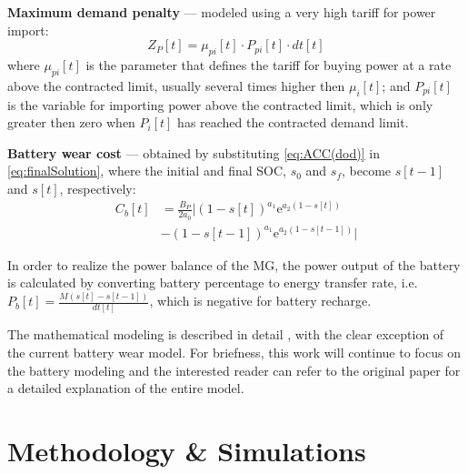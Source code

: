 \documentclass{ieeeaccess}
\begin{document}
    \textbf{Maximum demand penalty} --- modeled using a very high tariff for power import:
    \begin{equation}
        Z_P[t] = \mu_{pi}[t] \cdot P_{pi}[t] \cdot dt[t]
    \end{equation}
    where $\mu_{pi}[t]$ is the parameter that defines the tariff for buying power at a rate above the contracted limit, usually several times higher then $\mu_i[t]$; and $P_{pi}[t]$ is the variable for importing power above the contracted limit, which is only greater then zero when $P_i[t]$ has reached the contracted demand limit.

    \textbf{Battery wear cost} --- obtained by substituting \eqref{eq:ACC(dod)} in \eqref{eq:finalSolution}, where the initial and final \ac{SOC}, $s_0$ and $s_f$, become $s[t-1]$ and $s[t]$, respectively:
    \small
    \begin{equation}
        \begin{aligned}
            C_b[t] & = \frac{B_P}{2a_0} \Bigg|(1-s[t])^{a_1}\mathrm{e}^{a_2(1-s[t])} \\
            & - (1-s[t-1])^{a_1}\mathrm{e}^{a_2(1-s[t-1])} \Bigg|
        \end{aligned}
    \end{equation}
	\normalsize

    In order to realize the power balance of the \ac{MG}, the power output of the battery is calculated by converting battery percentage to energy transfer rate, i.e. $P_b[t] = \frac{M(s[t]-s[t-1])}{dt[t]}$, which is negative for battery recharge.
    
    The mathematical modeling is described in detail \cite{SANTOS2018}, with the clear exception of the current battery wear model. For briefness, this work will continue to focus on the battery modeling and the interested reader can refer to the original paper for a detailed explanation of the entire model.

    \section{Methodology \& Simulations}
\end{document}
